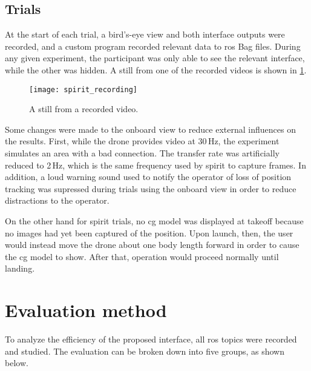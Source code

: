 \subsection{Trials}
At the start of each trial, a bird's-eye view and both interface outputs were recorded, and a custom program recorded relevant data to \gls{ros} Bag files.
During any given experiment, the participant was only able to see the relevant interface, while the other was hidden.
A still from one of the recorded videos is shown in \ref{fig:obs}.

\begin{figure}[h]
  \centering
  \texttt{[image: spirit\_recording]}
  \caption[Recording sample]{A still from a recorded video.}
  \label{fig:obs}
\end{figure}

Some changes were made to the onboard view to reduce external influences on the results.  
First, while the drone provides video at 30\,Hz, the experiment simulates an area with a bad connection.
The transfer rate was artificially reduced to 2\,Hz, which is the same frequency used by \gls{spirit} to capture frames.
In addition, a loud warning sound used to notify the operator of loss of position tracking was supressed during trials using the onboard view in order to reduce distractions to the operator.

On the other hand for \gls{spirit} trials, no \gls{cg} model was displayed at takeoff because no images had yet been captured of the position.
Upon launch, then, the user would instead move the drone about one body length forward in order to cause the \gls{cg} model to show.
After that, operation would proceed normally until landing.

\section{Evaluation method}
  \label{sec:experiment_eval}
  To analyze the efficiency of the proposed interface, all \gls{ros} topics were recorded and studied.
  The evaluation can be broken down into five groups, as shown below.

